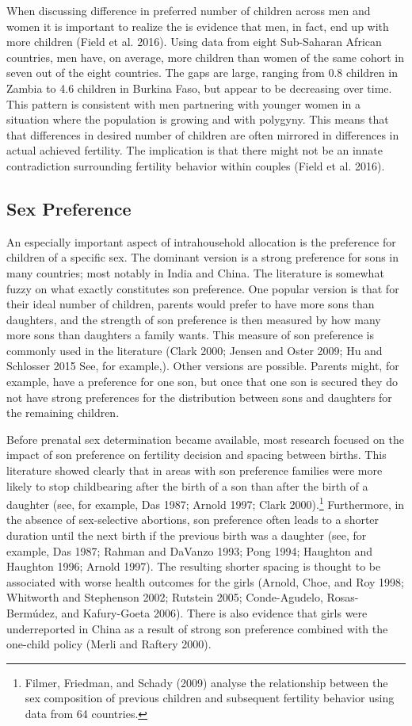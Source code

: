 \documentclass[]{article}
\begin{document}
When discussing difference in preferred number of children across men and women it is important to realize the is evidence that men, in fact, end up with more children (Field et al. 2016). Using data from eight Sub-Saharan African countries, men have, on average, more children than women of the same cohort in seven out of the eight countries. The gaps are large, ranging from 0.8 children in Zambia to 4.6 children in Burkina Faso, but appear to be decreasing over time. This pattern is consistent with men partnering with younger women in a situation where the population is growing and with polygyny. This means that that differences in desired number of children are often mirrored in differences in actual achieved fertility. The implication is that there might not be an innate contradiction surrounding fertility behavior within couples (Field et al. 2016).

\subsection{Sex Preference}\label{sex-preference}

An especially important aspect of intrahousehold allocation is the preference for children of a specific sex. The dominant version is a strong preference for sons in many countries; most notably in India and China. The literature is somewhat fuzzy on what exactly constitutes son preference. One popular version is that for their ideal number of children, parents would prefer to have more sons than daughters, and the strength of son preference is then measured by how many more sons than daughters a family wants. This measure of son preference is commonly used in the literature (Clark 2000; Jensen and Oster 2009; Hu and Schlosser 2015 See, for example,). Other versions are possible. Parents might, for example, have a preference for one son, but once that one son is secured they do not have strong preferences for the distribution between sons and daughters for the remaining children.

Before prenatal sex determination became available, most research focused on the impact of son preference on fertility decision and spacing between births. This literature showed clearly that in areas with son preference families were more likely to stop childbearing after the birth of a son than after the birth of a daughter (see, for example, Das 1987; Arnold 1997; Clark 2000).\footnote{Filmer, Friedman, and Schady (2009) analyse the relationship between the sex composition of previous children and subsequent fertility behavior using data from 64 countries.} Furthermore, in the absence of sex-selective abortions, son preference often leads to a shorter duration until the next birth if the previous birth was a daughter (see, for example, Das 1987; Rahman and DaVanzo 1993; Pong 1994; Haughton and Haughton 1996; Arnold 1997). The resulting shorter spacing is thought to be associated with worse health outcomes for the girls (Arnold, Choe, and Roy 1998; Whitworth and Stephenson 2002; Rutstein 2005; Conde-Agudelo, Rosas-Bermúdez, and Kafury-Goeta 2006). There is also evidence that girls were underreported in China as a result of strong son preference combined with the one-child policy (Merli and Raftery 2000).
\end{document}

